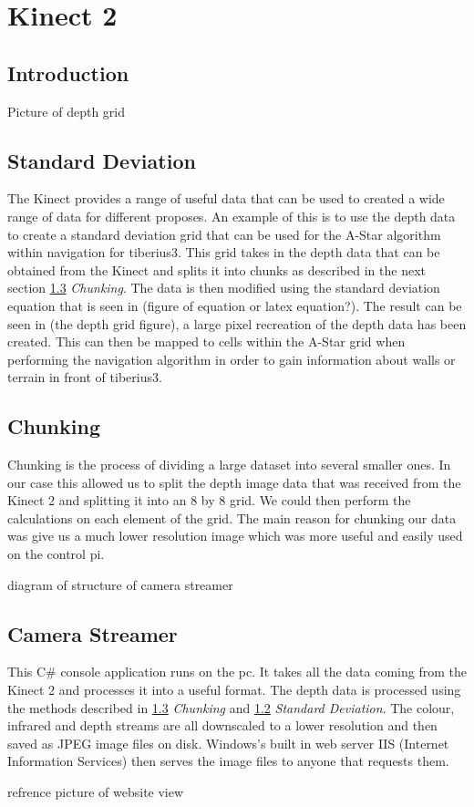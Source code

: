 \section{Kinect 2}

\subsection{Introduction}

Picture of depth grid

\subsection{Standard Deviation}\label{StandardDeviation}
The Kinect provides a range of useful data that can be used to created a wide range of data for different proposes. An example of this is to use the depth data to create a standard deviation grid that can be used for the A-Star algorithm within navigation for \gls{tiberius3}. This grid takes in the depth data that can be obtained from the Kinect and splits it into chunks as described in the next section \ref{Chunking} \textit{Chunking}. The data is then modified using the standard deviation equation that is seen in (figure of equation or latex equation?). The result can be seen in (the depth grid figure), a large pixel recreation of the depth data has been created. This can then be mapped to cells within the A-Star grid when performing the navigation algorithm in order to gain information about walls or terrain in front of \gls{tiberius3}.
\subsection{Chunking}\label{Chunking}
Chunking is the process of dividing a large dataset into several smaller ones. In our case this allowed us to split the depth image data that was received from the Kinect 2 and splitting it into an 8 by 8 grid. We could then perform the calculations on each element of the grid. The main reason for chunking our data was give us a much lower resolution image which was more useful and easily used on the control pi.

diagram of structure of camera streamer

\subsection{Camera Streamer}
This C\# console application runs on the pc. It takes all the data coming from the Kinect 2 and processes it into a useful format.
The depth data is processed using the methods described in \ref{Chunking} \textit{Chunking} and \ref{StandardDeviation} \textit{Standard Deviation}. The colour, infrared and depth streams are all downscaled to a lower resolution and then saved as JPEG image files on disk. Windows's built in web server IIS (Internet Information Services) then serves the image files to anyone that requests them.
  
refrence picture of website view

\pagestyle{euanstuart}













